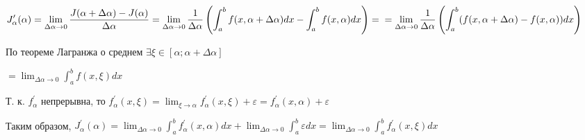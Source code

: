 \documentclass[12pt]{article}
\begin{document}
    \begin{MyProof}
        $\displaystyle J^\prime_\alpha(\alpha) = \lim_{\Delta \alpha \to 0} \frac{J(\alpha + \Delta \alpha) - J(\alpha)}{\Delta \alpha} =
        \lim_{\Delta \alpha \to 0} \frac{1}{\Delta \alpha} \left(\int^b_a f(x, \alpha + \Delta \alpha)dx - \int^b_a f(x, \alpha)dx\right) = \\
        = \lim_{\Delta \alpha \to 0} \frac{1}{\Delta \alpha} \left(\int^b_a (f(x, \alpha + \Delta \alpha) - f(x, \alpha))dx\right)$

        По теореме Лагранжа о среднем $\exists \xi \in [\alpha; \alpha + \Delta \alpha]$

        $\displaystyle = \lim_{\Delta \alpha \to 0} \int^b_a f(x, \xi)dx$

        Т. к. $f^\prime_\alpha$ непрерывна, то $\displaystyle f^\prime_\alpha (x, \xi) = \lim_{\xi \to \alpha} f^\prime_\alpha (x, \xi) + \varepsilon = f^\prime_\alpha (x, \alpha) + \varepsilon$

        Таким образом, $\displaystyle J^\prime_\alpha(\alpha) = \lim_{\Delta \alpha \to 0} \int^{b}_{a} f^\prime_{\alpha}(x, \alpha) dx + \lim_{\Delta \alpha \to 0} \int^{b}_{a} \varepsilon dx =
        \lim_{\Delta \alpha \to 0} \int^{b}_{a} f^\prime_{\alpha}(x, \xi) dx$
    \end{MyProof}
\end{document}

